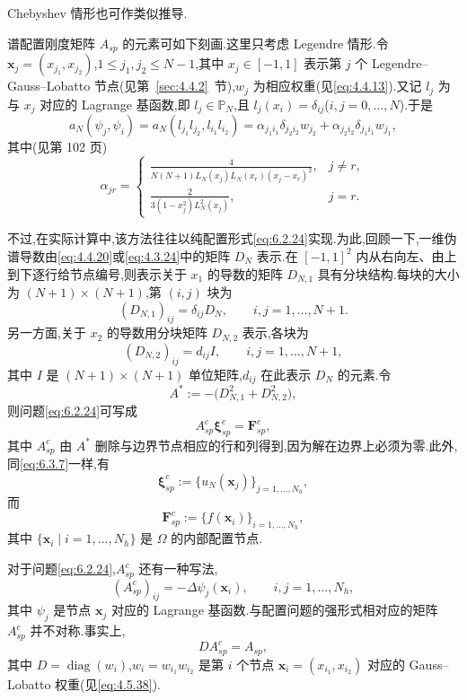Chebyshev 情形也可作类似推导.

谱配置刚度矩阵 \(A_{sp}\) 的元素可如下刻画.这里只考虑 Legendre 情形.令 \(\boldsymbol{x}_j=(x_{j_1},x_{j_2})\),\(1\le j_1,j_2\le N-1\),其中 \(x_j\in[-1,1]\) 表示第 \(j\) 个 Legendre--Gauss--Lobatto 节点(见第~\ref{sec:4.4.2}~节),\(w_j\) 为相应权重(见\eqref{eq:4.4.13}).又记 \(l_j\) 为与 \(x_j\) 对应的 Lagrange 基函数,即 \(l_j\in\mathbb P_N\),且 \(l_j(x_i)=\delta_{ij}\)(\(i,j=0,\ldots,N\)).于是
\[
  a_N(\psi_j,\psi_i)=a_N(l_{j_1}l_{j_2},l_{i_1}l_{i_2})
    =\alpha_{j_1i_1}\delta_{j_2i_2}w_{j_2}+\alpha_{j_2i_2}\delta_{j_1i_1}w_{j_1},
\]
其中(见第 102 页)
\[
  \alpha_{jr}=
  \begin{cases}
    \displaystyle\frac{4}{N(N+1)L_N(x_j)L_N(x_r)(x_j-x_r)^2},& j\ne r,\\[6pt]
    \displaystyle\frac{2}{3(1-x_j^2)L_N^2(x_j)},& j=r.
  \end{cases}
\]

不过,在实际计算中,该方法往往以纯配置形式\eqref{eq:6.2.24}实现.为此,回顾一下,一维伪谱导数由\eqref{eq:4.4.20}或\eqref{eq:4.3.24}中的矩阵 \(D_N\) 表示.在 \([-1,1]^2\) 内从右向左、由上到下逐行给节点编号,则表示关于 \(x_1\) 的导数的矩阵 \(D_{N,1}\) 具有分块结构.每块的大小为 \((N+1)\times(N+1)\),第 \((i,j)\) 块为
\[
  (D_{N,1})_{ij}=\delta_{ij}D_N,\qquad i,j=1,\ldots,N+1.
\]
另一方面,关于 \(x_2\) 的导数用分块矩阵 \(D_{N,2}\) 表示,各块为
\[
  (D_{N,2})_{ij}=d_{ij}I,\qquad i,j=1,\ldots,N+1,
\]
其中 \(I\) 是 \((N+1)\times(N+1)\) 单位矩阵,\(d_{ij}\) 在此表示 \(D_N\) 的元素.令
\[
  A^*:=-\bigl(D_{N,1}^2+D_{N,2}^2\bigr),
\]
则问题\eqref{eq:6.2.24}可写成
\begin{equation}\label{eq:6.3.8}
  A_{sp}^c\boldsymbol{\xi}_{sp}^c=\boldsymbol{F}_{sp}^c,
\end{equation}
其中 \(A_{sp}^c\) 由 \(A^*\) 删除与边界节点相应的行和列得到,因为解在边界上必须为零.此外,同\eqref{eq:6.3.7}一样,有
\begin{equation}\label{eq:6.3.9}
  \boldsymbol{\xi}_{sp}^c:=\{u_N(\boldsymbol{x}_j)\}_{j=1,\ldots,N_h},
\end{equation}
而
\begin{equation}\label{eq:6.3.10}
  \boldsymbol{F}_{sp}^c:=\{f(\boldsymbol{x}_i)\}_{i=1,\ldots,N_h},
\end{equation}
其中 \(\{\boldsymbol{x}_i\mid i=1,\ldots,N_h\}\) 是 \(\Omega\) 的内部配置节点.

对于问题\eqref{eq:6.2.24},\(A_{sp}^c\) 还有一种写法,
\begin{equation}\label{eq:6.3.11}
  (A_{sp}^c)_{ij}=-\Delta\psi_j(\boldsymbol{x}_i),\qquad i,j=1,\ldots,N_h,
\end{equation}
其中 \(\psi_j\) 是节点 \(\boldsymbol{x}_j\) 对应的 Lagrange 基函数.与配置问题的强形式相对应的矩阵 \(A_{sp}^c\) 并不对称.事实上,
\begin{equation}\label{eq:6.3.12}
  DA_{sp}^c=A_{sp},
\end{equation}
其中 \(D=\operatorname{diag}(w_i)\),\(w_i=w_{i_1}w_{i_2}\) 是第 \(i\) 个节点 \(\boldsymbol{x}_i=(x_{i_1},x_{i_2})\) 对应的 Gauss--Lobatto 权重(见\eqref{eq:4.5.38}).

